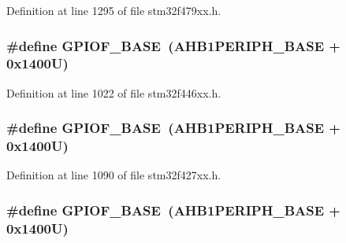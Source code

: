 Definition at line 1295 of file stm32f479xx.\+h.

\subsubsection[{\texorpdfstring{G\+P\+I\+O\+F\+\_\+\+B\+A\+SE}{GPIOF_BASE}}]{\setlength{\rightskip}{0pt plus 5cm}\#define G\+P\+I\+O\+F\+\_\+\+B\+A\+SE~({\bf A\+H\+B1\+P\+E\+R\+I\+P\+H\+\_\+\+B\+A\+SE} + 0x1400\+U)}\hypertarget{group___peripheral__memory__map_ga7f9a3f4223a1a784af464a114978d26e}{}\label{group___peripheral__memory__map_ga7f9a3f4223a1a784af464a114978d26e}


Definition at line 1022 of file stm32f446xx.\+h.

\subsubsection[{\texorpdfstring{G\+P\+I\+O\+F\+\_\+\+B\+A\+SE}{GPIOF_BASE}}]{\setlength{\rightskip}{0pt plus 5cm}\#define G\+P\+I\+O\+F\+\_\+\+B\+A\+SE~({\bf A\+H\+B1\+P\+E\+R\+I\+P\+H\+\_\+\+B\+A\+SE} + 0x1400\+U)}\hypertarget{group___peripheral__memory__map_ga7f9a3f4223a1a784af464a114978d26e}{}\label{group___peripheral__memory__map_ga7f9a3f4223a1a784af464a114978d26e}


Definition at line 1090 of file stm32f427xx.\+h.

\subsubsection[{\texorpdfstring{G\+P\+I\+O\+F\+\_\+\+B\+A\+SE}{GPIOF_BASE}}]{\setlength{\rightskip}{0pt plus 5cm}\#define G\+P\+I\+O\+F\+\_\+\+B\+A\+SE~({\bf A\+H\+B1\+P\+E\+R\+I\+P\+H\+\_\+\+B\+A\+SE} + 0x1400\+U)}\hypertarget{group___peripheral__memory__map_ga7f9a3f4223a1a784af464a114978d26e}{}\label{group___peripheral__memory__map_ga7f9a3f4223a1a784af464a114978d26e}


